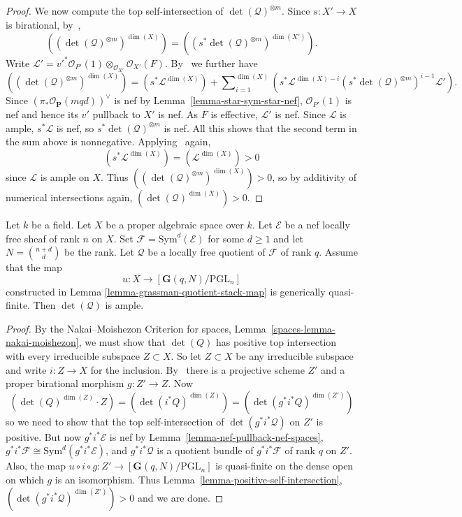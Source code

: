 \begin{proof}
We now compute the top self-intersection of $\det(\mathcal{Q})^{\otimes m}$.
Since $s : X' \to X$ is birational, by~,
$$
  ((\det(\mathcal{Q})^{\otimes m})^{\dim(X)})
    = ((s^*\det(\mathcal{Q})^{\otimes m})^{\dim(X')}).
$$
Write
$\mathcal{L}'
  = v'^*\mathcal{O}_{P'}(1) \otimes_{\mathcal{O}_{X'}} \mathcal{O}_{X'}(F)$.
By~ we further have
$$
  ((\det(\mathcal{Q})^{\otimes m})^{\dim(X)})
    = (s^*\mathcal{L}^{\dim(X)})
      + \sum\nolimits_{i = 1}^{\dim(X)}
          (s^*\mathcal{L}^{\dim(X) - i} (s^*\det(\mathcal{Q})^{\otimes m})^{i - 1} \mathcal{L}').
$$
Since $(\pi_*\mathcal{O}_{\mathbf{P}}(mqd))^\vee$ is nef by
Lemma~\ref{lemma-star-sym-star-nef},
$\mathcal{O}_{P'}(1)$ is nef and hence its $v'$ pullback to $X'$ is nef.
As $F$ is effective, $\mathcal{L}'$ is nef.
Since $\mathcal{L}$ is ample, $s^*\mathcal{L}$ is nef, so
$s^*\det(\mathcal{Q})^{\otimes m}$ is nef.
All this shows that the second term in the sum above is nonnegative.
Applying~ again,
$$
  (s^*\mathcal{L}^{\dim(X)}) = (\mathcal{L}^{\dim(X)}) > 0
$$
since $\mathcal{L}$ is ample on $X$.
Thus $((\det(\mathcal{Q})^{\otimes m})^{\dim(X)}) > 0$, so by additivity of
numerical intersections again, $(\det(\mathcal{Q})^{\dim(X)}) > 0$.
\end{proof}

\begin{lemma}
\label{lemma-ampleness-of-semipos-quotients}
Let $k$ be a field.
Let $X$ be a proper algebraic space over $k$.
Let $\mathcal{E}$ be a nef locally free sheaf of rank $n$ on $X$.
Set $\mathcal{F} = \mathrm{Sym}^d(\mathcal{E})$ for some $d \geq 1$ and
let $N = \binom{n + d}{d}$ be the rank.
Let $\mathcal{Q}$ be a locally free quotient of $\mathcal{F}$ of rank $q$.
Assume that the map
$$
u : X \to [\mathbf{G}(q,N)/\mathrm{PGL}_n]
$$
constructed in Lemma \ref{lemma-grassman-quotient-stack-map}
is generically quasi-finite.
Then $\det(\mathcal{Q})$ is ample.
\end{lemma}

\begin{proof}
By the Nakai--Moishezon Criterion for spaces,
Lemma~\ref{spaces-lemma-nakai-moishezon},
we must show that $\det(Q)$ has positive top intersection with every
irreducible subspace $Z \subset X$.
So let $Z \subset X$ be any irreducible subspace and write $i : Z \to X$ for
the inclusion.
By~ there is a projective scheme $Z'$ and a proper birational
morphism $g : Z' \to Z$.
Now
$$
  (\det(Q)^{\dim(Z)} \cdot Z)
    = (\det(i^*Q)^{\dim(Z)})
    = (\det(g^*i^*Q)^{\dim(Z')})
$$
so we need to show that the top self-intersection of $\det(g^*i^*\mathcal{Q})$
on $Z'$ is positive.
But now $g^*i^*\mathcal{E}$ is nef by Lemma~\ref{lemma-nef-pullback-nef-spaces},
$g^*i^*\mathcal{F} \cong \mathrm{Sym}^d(g^*i^*\mathcal{E})$,
and $g^*i^*\mathcal{Q}$ is a quotient bundle of $g^*i^*\mathcal{F}$ of rank $q$
on $Z'$.
Also, the map $u \circ i \circ g : Z' \to [\mathbf{G}(q,N)/\mathrm{PGL}_n]$
is quasi-finite on the dense open on which $g$ is an isomorphism.
Thus Lemma~\ref{lemma-positive-self-intersection},
$(\det(g^*i^*\mathcal{Q})^{\dim(Z')}) > 0$ and we are done.
\end{proof}


